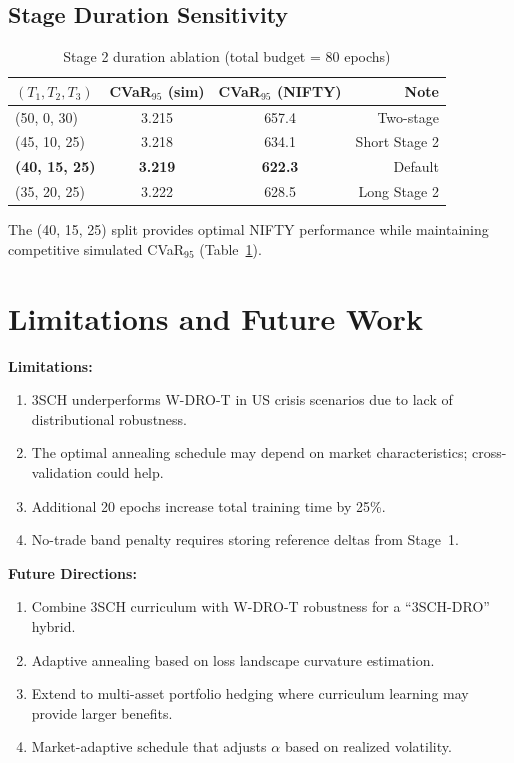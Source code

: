 \documentclass[11pt]{article}
\begin{document}
\subsection{Stage Duration Sensitivity}

\begin{table}[t]
\centering
\caption{Stage 2 duration ablation (total budget = 80 epochs)}
\label{tab:ablation_duration}
\small
\begin{tabular}{lccr}
\toprule
\textbf{$(T_1, T_2, T_3)$} & \textbf{CVaR$_{95}$ (sim)} & \textbf{CVaR$_{95}$ (NIFTY)} & \textbf{Note} \\
\midrule
(50, 0, 30) & 3.215 & 657.4 & Two-stage \\
(45, 10, 25) & 3.218 & 634.1 & Short Stage 2 \\
\textbf{(40, 15, 25)} & \textbf{3.219} & \textbf{622.3} & Default \\
(35, 20, 25) & 3.222 & 628.5 & Long Stage 2 \\
\bottomrule
\end{tabular}
\end{table}

The (40, 15, 25) split provides optimal NIFTY performance while maintaining competitive simulated CVaR$_{95}$ (Table~\ref{tab:ablation_duration}).

\section{Limitations and Future Work}

\textbf{Limitations:}
\begin{enumerate}[noitemsep,leftmargin=*]
    \item 3SCH underperforms W-DRO-T in US crisis scenarios due to lack of distributional robustness.
    \item The optimal annealing schedule may depend on market characteristics; cross-validation could help.
    \item Additional 20 epochs increase total training time by 25\%.
    \item No-trade band penalty requires storing reference deltas from Stage~1.
\end{enumerate}

\textbf{Future Directions:}
\begin{enumerate}[noitemsep,leftmargin=*]
    \item Combine 3SCH curriculum with W-DRO-T robustness for a ``3SCH-DRO'' hybrid.
    \item Adaptive annealing based on loss landscape curvature estimation.
    \item Extend to multi-asset portfolio hedging where curriculum learning may provide larger benefits.
    \item Market-adaptive schedule that adjusts $\alpha$ based on realized volatility.
\end{enumerate}
\end{document}
